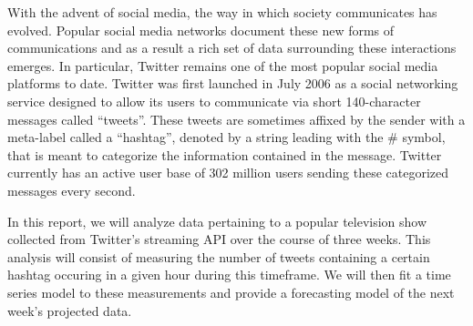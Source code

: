 With the advent of social media, the way in which society communicates has evolved. Popular
social media networks document these new forms of communications and as a result a rich
set of data surrounding these interactions emerges. In particular, Twitter
remains one of the most popular social media platforms
to date. Twitter was first launched in July 2006 as a social networking service
designed to allow its users to communicate via short 140-character messages
called ``tweets''. These tweets are sometimes affixed by the sender with a meta-label
called a ``hashtag'', denoted by a string leading with the \# symbol, that is
meant to categorize the information contained in the
message. Twitter currently has an active user base of 302 million users sending
these categorized messages every second.

In this report, we will analyze data pertaining to a popular television show
collected from Twitter's streaming API over the course of three weeks. This
analysis will consist of measuring the number of tweets containing a certain
hashtag occuring in a given hour during this timeframe. We will then fit a time
series model to these measurements and provide a forecasting model of the next
week's projected data.